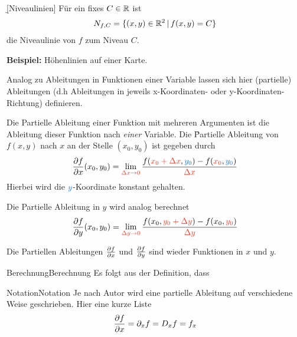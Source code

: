 \documentclass[12pt]{article}
\begin{document}
\begin{defn}{\b{[Niveaulinien]}}
        Für ein fixes $C\in\mathbb{R}$ ist
        \begin{align}
                N_{f,C}=\{(x,y)\in\mathbb{R}^2\,|\,f(x,y)=C\}
        \end{align}
        die Niveaulinie von $f$ zum Niveau $C$.

        \textbf{Beispiel:} Höhenlinien auf einer Karte.
\end{defn}

Analog zu Ableitungen in Funktionen einer Variable lassen sich hier (partielle)
Ableitungen (d.h Ableitungen in jeweils x-Koordinaten- oder
y-Koordinaten-Richtung) definieren.

\begin{thmb}{\emph{}}
        Die Partielle Ableitung einer Funktion mit mehreren Argumenten ist die Ableitung dieser Funktion nach \emph{einer} Variable. Die \r{Partielle Ableitung von $f(x,y)$ nach $x$ an der Stelle $(x_0,y_0)$} ist gegeben durch
        \begin{align}
                \pdv{f}{x}(x_0,y_0)=\lim_{\r{\Delta x\to0}}\frac{f(\r{x_0+\Delta x},\b{y_0})-f(\r{x_0},\b{y_0
                        })}{\r{\Delta x}}
        \end{align}
        Hierbei wird die $\b y$-Koordinate konstant gehalten.

        Die Partielle Ableitung in \r{$y$} wird analog berechnet
        \begin{align}
                \pdv{f}{y}(x_0,y_0)=\lim_{\r{\Delta y\to0}}\frac{f(x_0,\r{y_0+\Delta y})-f(x_0,\r{y_0})}{\r{\Delta y}}
        \end{align}
\end{thmb}

Die Partiellen Ableitungen $\pdv{f}{x}$ und $\pdv{f}{y}$ sind wieder Funktionen
in $x$ und $y$.

\begin{rmk}{Berechnung}{Berechnung}
        Es folgt aus der Definition, dass 
\end{rmk}

\begin{rmk}{Notation}{Notation}
        Je nach Autor wird eine partielle Ableitung auf verschiedene Weise geschrieben. Hier eine kurze Liste
        \begin{align*}
                \pdv{f}{x} = \partial_x f = D_x f = f_x
        \end{align*}
\end{rmk}\vspace*{1em}
\end{document}
